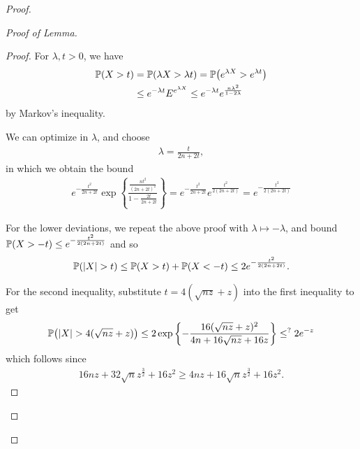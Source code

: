 \begin{proof}
\begin{proof}[Proof of Lemma]
\begin{proof}
      For $\lambda, t > 0$, we have
      \begin{align}
        \label{eq:175}
        \Prob{X > t} &= \Prob{\lambda X > \lambda t} = \Prob{e^{\lambda
            X} > e^{\lambda t}} \\
        &\leq e^{-\lambda t} E^{e^{\lambda X}} \leq e^{-\lambda t}
        e^{\frac{n \lambda^{2}}{1 - 2 \lambda}}
      \end{align} by Markov's inequality.

      We can optimize in $\lambda$, and choose
      \begin{align}
        \label{eq:176}
        \lambda = \frac{t}{2n + 2t},
      \end{align} in which we obtain the bound
      \begin{align}
        \label{eq:177}
        e^{-\frac{t^{2}}{2n + 2t}} \exp \left\{ \frac{\frac{nt^{2}}{(2n +
            2t)^{2}}}{1 - \frac{2t}{2n + 2t}} \right\} = e^{-\frac{t^{2}}{2n +
            2t}} e^{\frac{t^{2}}{2(2n + 2t)}} = e^{-\frac{t^{2}}{2(2n
            + 2t)}}
      \end{align}

      For the lower deviations, we repeat the above proof with
      $\lambda \mapsto - \lambda$, and bound $\Prob{X > -t} \leq
      e^{-\frac{t^{2}}{2(2n + 2t)}}$ and so
      \begin{align}
        \label{eq:178}
        \Prob{|X| > t} \leq \Prob{X > t} + \Prob{X < -t} \leq 2
        e^{-\frac{t^{2}}{2(2n + 2t)}}.
      \end{align}

      For the second inequality, substitute $t = 4 (\sqrt{nz} + z)$
      into the first inequality to get
      \begin{align}
        \label{eq:179}
        \Prob{|X| > 4 (\sqrt{nz} + z)} \leq 2 \exp \left\{
          -\frac{16(\sqrt{nz} + z)^{2}}{4n + 16 \sqrt{nz} + 16z}
        \right\} \leq^{?} 2e^{-z}
      \end{align} which follows since
      \begin{align}
        \label{eq:180}
        16nz + 32 \sqrt{n} z^{\frac{3}{2}} + 16 z^{2} \geq 4nz + 16
        \sqrt{n} z^{\frac{3}{2}} + 16 z^{2}.
      \end{align}
    \end{proof}


\end{proof}
\end{proof}
